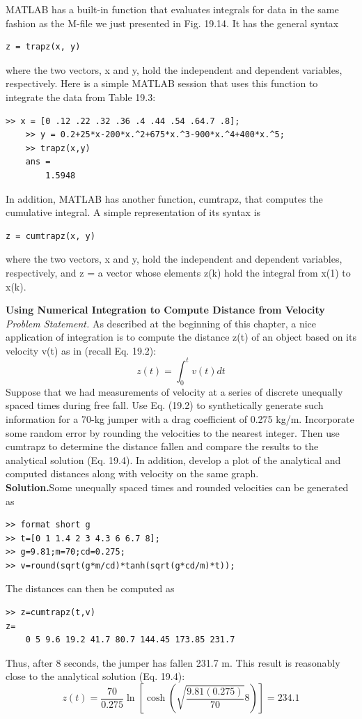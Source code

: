 \documentclass[../main.tex]{subfiles}
\begin{document}
MATLAB has a built-in function that evaluates integrals for data in the same fashion as the
M-file we just presented in Fig. 19.14. It has the general syntax 

\begin{lstlisting}[numbers=none]
	z = trapz(x, y)
\end{lstlisting}
where the two vectors, x and y, hold the independent and dependent variables, respectively.
Here is a simple MATLAB session that uses this function to integrate the data from
Table 19.3:

\begin{lstlisting}[numbers=none]
	>> x = [0 .12 .22 .32 .36 .4 .44 .54 .64.7 .8];
	>> y = 0.2+25*x-200*x.^2+675*x.^3-900*x.^4+400*x.^5;
	>> trapz(x,y)
	ans =
		1.5948
\end{lstlisting}
In addition, MATLAB has another function, cumtrapz, that computes the cumulative
integral. A simple representation of its syntax is 

\begin{lstlisting}[numbers=none]
	z = cumtrapz(x, y)
\end{lstlisting}
where the two vectors, x and y, hold the independent and dependent variables, respectively,
and z = a vector whose elements z(k) hold the integral from x(1) to x(k).

\begin{exmp} \textbf{Using Numerical Integration to Compute Distance from Velocity}
    \noindent\textit{Problem Statement.} As described at the beginning of this chapter, a nice application
	of integration is to compute the distance z(t) of an object based on its velocity v(t) as in
	(recall Eq. 19.2):
$$z(t)=\int_{0}^{t} v(t) d t$$
	Suppose that we had measurements of velocity at a series of discrete unequally spaced times
during free fall. Use Eq. (19.2) to synthetically generate such information for a 70-kg
jumper with a drag coefficient of 0.275 kg/m. Incorporate some random error by rounding
the velocities to the nearest integer. Then use cumtrapz to determine the distance fallen and
compare the results to the analytical solution (Eq. 19.4). In addition, develop a plot of the
analytical and computed distances along with velocity on the same graph.\\
    \noindent \textbf{Solution.}Some unequally spaced times and rounded velocities can be generated as
	\begin{lstlisting}[numbers=none]
>> format short g
>> t=[0 1 1.4 2 3 4.3 6 6.7 8];
>> g=9.81;m=70;cd=0.275;
>> v=round(sqrt(g*m/cd)*tanh(sqrt(g*cd/m)*t));
	\end{lstlisting}
	The distances can then be computed as 
	\begin{lstlisting}[numbers=none]
>> z=cumtrapz(t,v)
z=
	0 5 9.6 19.2 41.7 80.7 144.45 173.85 231.7

	\end{lstlisting}
\end{exmp}
Thus, after 8 seconds, the jumper has fallen 231.7 m. This result is reasonably close to the
analytical solution (Eq. 19.4):
\begin{equation}
	\nonumber
	z(t)=\frac{70}{0.275} \ln \left[\cosh \left(\sqrt{\frac{9.81(0.275)}{70}} 8\right)\right]=234.1
	\end{equation}
\end{document}

